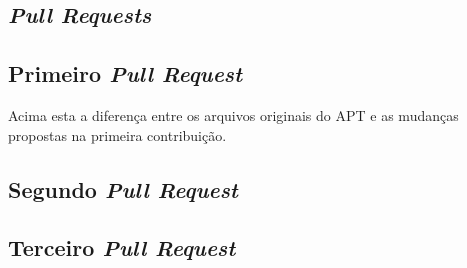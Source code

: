 \begin{apendicesenv}
\chapter{\textit{Pull Requests}}
\label{cha:pull_requests}

\section{Primeiro \textit{Pull Request}}
\label{sec:primeiro_pr}
	

Acima esta a diferença entre os arquivos originais do {\code APT} e as mudanças propostas na primeira contribuição.


\section{Segundo \textit{Pull Request}}
\label{sec:segundo_pr}
	


\section{Terceiro \textit{Pull Request}}
\label{sec:segundo_pr}
	




\end{apendicesenv}
